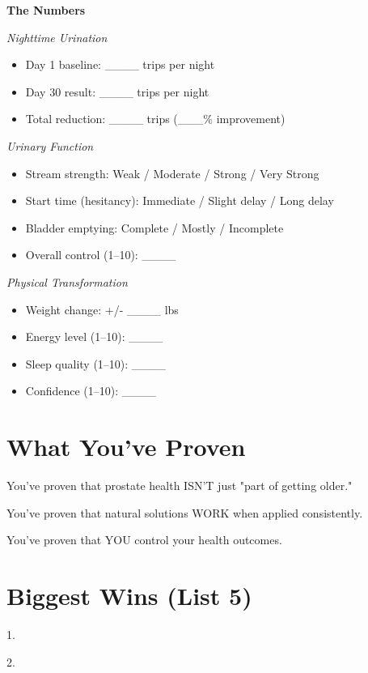 \documentclass[11pt,oneside]{book}
\begin{document}
\textbf{The Numbers}

\textit{Nighttime Urination}
\begin{itemize}[leftmargin=*]
\item Day 1 baseline: \_\_\_\_ trips per night
\item Day 30 result: \_\_\_\_ trips per night
\item Total reduction: \_\_\_\_ trips (\_\_\_\% improvement)
\end{itemize}

\textit{Urinary Function}
\begin{itemize}[leftmargin=*]
\item Stream strength: Weak / Moderate / Strong / Very Strong
\item Start time (hesitancy): Immediate / Slight delay / Long delay
\item Bladder emptying: Complete / Mostly / Incomplete
\item Overall control (1--10): \_\_\_\_
\end{itemize}

\textit{Physical Transformation}
\begin{itemize}[leftmargin=*]
\item Weight change: +/- \_\_\_\_ lbs
\item Energy level (1--10): \_\_\_\_
\item Sleep quality (1--10): \_\_\_\_
\item Confidence (1--10): \_\_\_\_
\end{itemize}

\section*{What You've Proven}

You've proven that prostate health ISN'T just "part of getting older."

You've proven that natural solutions WORK when applied consistently.

You've proven that YOU control your health outcomes.

\section*{Biggest Wins (List 5)}

1. \underline{\hspace{10cm}}

2. \underline{\hspace{10cm}}
\end{document}
